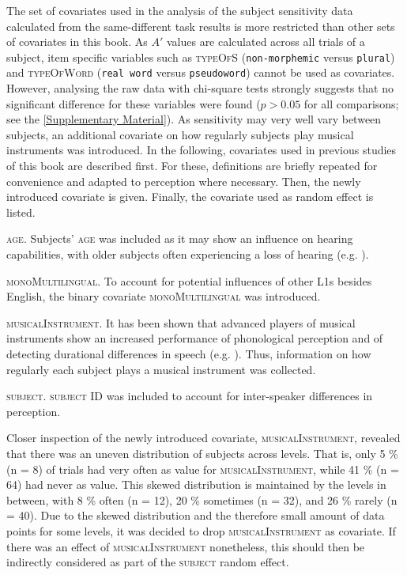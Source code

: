 The set of covariates used in the analysis of the subject sensitivity data calculated from the same-different task results is more restricted than other sets of covariates in this book. As $A'$ values are calculated across all trials of a subject, item specific variables such as \textsc{typeOfS} (\texttt{non-morphemic} versus \texttt{plural}) and \textsc{typeOfWord} (\texttt{real word} versus \texttt{pseudoword}) cannot be used as covariates. However, analysing the raw data with chi-square tests strongly suggests that no significant difference for these variables were found ($p>0.05$ for all comparisons; see the \ref{Supplementary Material}). As sensitivity may very well vary between subjects, an additional covariate on how regularly subjects play musical instruments was introduced. In the following, covariates used in previous studies of this book are described first. For these, definitions are briefly repeated for convenience and adapted to perception where necessary. Then, the newly introduced covariate is given. Finally, the covariate used as random effect is listed.

\textsc{age}. Subjects’ \textsc{age} was included as it may show an influence on hearing capabilities, with older subjects often experiencing a loss of hearing (e.g. \cite{Lee2013}).

\textsc{monoMultilingual}. To account for potential influences of other L1s besides English, the binary covariate \textsc{monoMultilingual} was introduced. 

\textsc{musicalInstrument}. It has been shown that advanced players of musical instruments show an increased performance of phonological perception and of detecting durational differences in speech (e.g. \cite{Anvari2002,Milovanov2009}). Thus, information on how regularly each subject plays a musical instrument was collected.

\textsc{subject}. \textsc{subject} ID was included to account for inter-speaker differences in perception.

Closer inspection of the newly introduced covariate, \textsc{musicalInstrument}, revealed that there was an uneven distribution of subjects across levels. That is, only 5 \% (n = 8) of trials had very often as value for \textsc{musicalInstrument}, while 41 \% (n = 64) had never as value. This skewed distribution is maintained by the levels in between, with 8 \% often (n = 12), 20 \% sometimes (n = 32), and 26 \% rarely (n = 40). Due to the skewed distribution and the therefore small amount of data points for some levels, it was decided to drop \textsc{musicalInstrument} as covariate. If there was an effect of \textsc{musicalInstrument} nonetheless, this should then be indirectly considered as part of the \textsc{subject} random effect.

